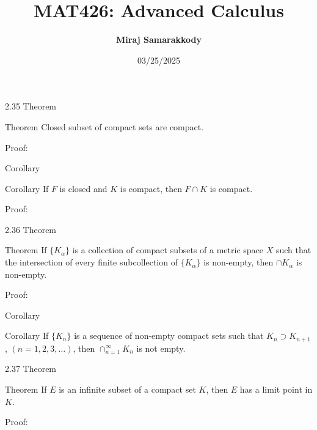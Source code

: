 \documentclass{beamer}
\title{MAT426: Advanced Calculus}
\author{\textbf{Miraj Samarakkody}}
\institute{Tougaloo College}
\date{03/25/2025}
\begin{document}
\begin{frame}
    \titlepage
\end{frame}

\begin{frame}{2.35 Theorem}
    \begin{block}{Theorem}
        Closed subset of compact sets are compact.
    \end{block}
    \begin{block}{Proof:}
    
    \end{block}

\end{frame}


\begin{frame}{Corollary} 
\begin{block}{Corollary}
If \(F\) is closed and \(K\) is compact, then \(F \cap K\) is compact. 
\end{block}

\begin{block}{Proof:}

\end{block}
\end{frame}

\begin{frame}{2.36 Theorem}
    \begin{block}{Theorem}
        If \(\{K_\alpha\}\) is a collection of compact subsets of a metric space \(X\) such that the intersection of every finite subcollection of \(\{K_\alpha\}\) is non-empty, then \(\cap K_\alpha\) is non-empty.
    \end{block}
\begin{block}{Proof:}

\end{block}
\end{frame}

\begin{frame}{Corollary}
\begin{block}{Corollary}
If \(\{K_n\}\) is a sequence of non-empty compact sets such that \(K_n \supset K_{n+1}\), \((n=1,2,3, \dots)\), then \(\cap_{n=1}^\infty K_n\) is not empty. 
\end{block}
\end{frame}

\begin{frame}{2.37 Theorem} 
    \begin{block}{Theorem}
        If \(E\) is an infinite subset of a compact set \(K\), then \(E\) has a limit point in \(K\). 
    \end{block}
    \begin{block}{Proof:}
    
    \end{block}

\end{frame}
\end{document}
